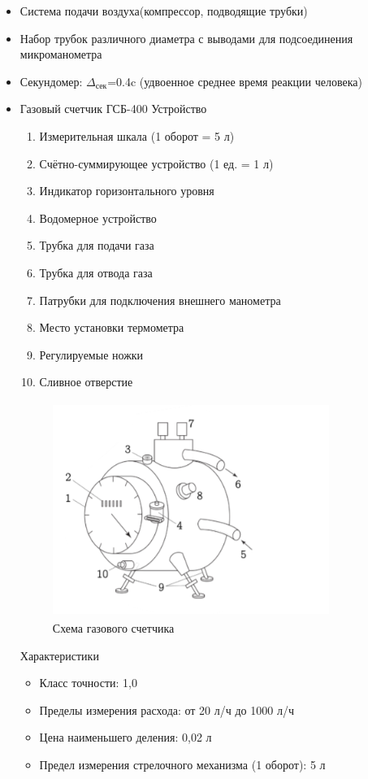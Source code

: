 \documentclass[12pt,a4paper]{article}
\begin{document}
\begin{itemize}
\item Система подачи воздуха(компрессор, подводящие трубки)
\item Набор трубок различного диаметра с выводами для подсоединения микроманометра
\item Секундомер: $\Delta_{\text{сек}}$=0.4c (удвоенное среднее время реакции человека)
\item Газовый счетчик ГСБ-400 \hfill \break
Устройство
\begin{enumerate}
\item Измерительная шкала (1 оборот = 5 л)
\item Счётно-суммирующее устройство (1 ед. = 1 л)
\item Индикатор горизонтального уровня
\item Водомерное устройство
\item Трубка для подачи газа
\item Трубка для отвода газа
\item Патрубки для подключения
внешнего манометра
\item Место установки термометра
\item Регулируемые ножки
\item Сливное отверстие
\end{enumerate}
\begin{figure}[H]
\centering
\includegraphics[width=9cm, height=7cm]{1.3.3_1}
\caption{Схема газового счетчика}
\label{pic:1}
\end{figure}
Характеристики
\begin{itemize}
\item Класс точности: 1,0
\item Пределы измерения расхода: от 20 л/ч до 1000 л/ч
\item Цена наименьшего деления: 0,02 л
\item Предел измерения стрелочного механизма (1 оборот): 5 л

\end{itemize}
\end{itemize}
\end{document}
